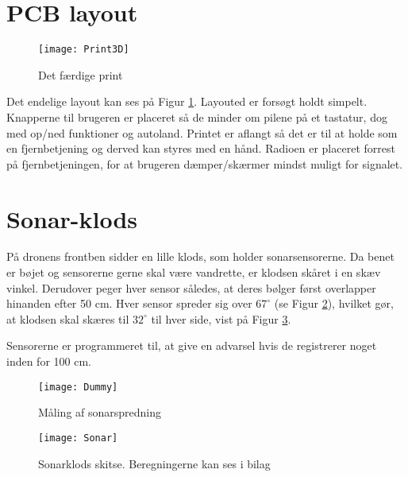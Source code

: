 \documentclass[Main]{subfiles}
\begin{document}
\section{PCB layout}

\begin{figure}[H]
\centering
\texttt{[image: Print3D]}
\caption{Det færdige print}
\label{fig: Print3D}
\end{figure}
Det endelige layout kan ses på Figur \ref{fig: Print3D}.
Layouted er forsøgt holdt simpelt. 
Knapperne til brugeren er placeret så de minder om pilene på et tastatur, dog med op/ned funktioner og autoland.
Printet er aflangt så det er til at holde som en fjernbetjening og derved kan styres med en hånd.
Radioen er placeret forrest på fjernbetjeningen, for at brugeren dæmper/skærmer mindst muligt for signalet.  



\section{Sonar-klods}\label{Sec:Sonar}
På dronens frontben sidder en lille klods, som holder sonarsensorerne.
Da benet er bøjet og sensorerne gerne skal være vandrette, er klodsen skåret i en skæv vinkel.
Derudover peger hver sensor således, at deres bølger først overlapper hinanden efter 50 cm.
Hver sensor spreder sig over $67^\circ$ (se Figur \ref{Fig:SonarMeasure}), hvilket gør, at klodsen skal skæres til $32^\circ$ til hver side, vist på Figur \ref{Fig:SonarSkitse}.

Sensorerne er programmeret til, at give en advarsel hvis de registrerer noget inden for 100 cm.

\begin{figure}[H]
\centering
	\texttt{[image: Dummy]}
	\caption{Måling af sonarspredning}
	\label{Fig:SonarMeasure}
\end{figure}

\begin{figure}[H]
\centering
	\texttt{[image: Sonar]}
	\caption{Sonarklods skitse. Beregningerne kan ses i bilag\cite{Klods}}
	\label{Fig:SonarSkitse}
\end{figure}
\end{document}
